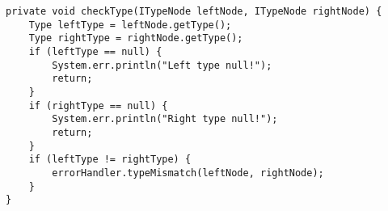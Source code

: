\begin{lstlisting}[caption={private function checkType in the type checker}, label={code:TC:checkType}]
private void checkType(ITypeNode leftNode, ITypeNode rightNode) {
    Type leftType = leftNode.getType();
    Type rightType = rightNode.getType();
    if (leftType == null) {
        System.err.println("Left type null!");
        return;
    }
    if (rightType == null) {
        System.err.println("Right type null!");
        return;
    }
    if (leftType != rightType) {
        errorHandler.typeMismatch(leftNode, rightNode);
    }
}
\end{lstlisting}